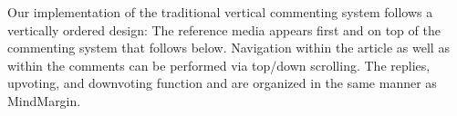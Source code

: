   
Our implementation of the traditional vertical commenting system follows a vertically ordered design: The reference media appears first and on top of the commenting system that follows below. Navigation within the article as well as within the comments can be performed via top/down scrolling. The replies, upvoting, and downvoting function and are organized in the same manner as MindMargin.